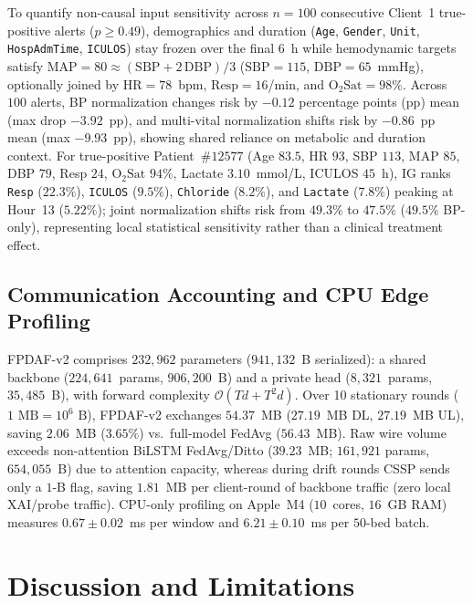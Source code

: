 \documentclass{llncs}
\begin{document}
To quantify non-causal input sensitivity across $n=100$ consecutive Client~1 true-positive alerts ($p\ge 0.49$), demographics and duration (\texttt{Age}, \texttt{Gender}, \texttt{Unit}, \texttt{HospAdmTime}, \texttt{ICULOS}) stay frozen over the final $6$~h while hemodynamic targets satisfy $\mathrm{MAP}=80\approx (\mathrm{SBP}+2\,\mathrm{DBP})/3$ ($\mathrm{SBP}=115$, $\mathrm{DBP}=65$~mmHg), optionally joined by $\mathrm{HR}=78$~bpm, $\mathrm{Resp}=16$/min, and $\mathrm{O}_2\mathrm{Sat}=98\%$. Across $100$ alerts, BP normalization changes risk by $-0.12$ percentage points (pp) mean (max drop $-3.92$~pp), and multi-vital normalization shifts risk by $-0.86$~pp mean (max $-9.93$~pp), showing shared reliance on metabolic and duration context. For true-positive Patient~$\#12577$ (Age $83.5$, HR $93$, SBP $113$, MAP $85$, DBP $79$, Resp $24$, $\mathrm{O}_2\mathrm{Sat}$ $94\%$, Lactate $3.10$~mmol/L, ICULOS $45$~h), IG ranks \texttt{Resp} ($22.3\%$), \texttt{ICULOS} ($9.5\%$), \texttt{Chloride} ($8.2\%$), and \texttt{Lactate} ($7.8\%$) peaking at Hour~13 ($5.22\%$); joint normalization shifts risk from $49.3\%$ to $47.5\%$ ($49.5\%$ BP-only), representing local statistical sensitivity rather than a clinical treatment effect.

\subsection{Communication Accounting and CPU Edge Profiling}

FPDAF-v2 comprises $232{,}962$ parameters ($941{,}132$~B serialized): a shared backbone ($224{,}641$~params, $906{,}200$~B) and a private head ($8{,}321$~params, $35{,}485$~B), with forward complexity $\mathcal{O}(Td+T^2d)$. Over 10 stationary rounds ($1\text{ MB}=10^6\text{ B}$), FPDAF-v2 exchanges $54.37$~MB ($27.19$~MB DL, $27.19$~MB UL), saving $2.06$~MB ($3.65\%$) vs.\ full-model FedAvg ($56.43$~MB). Raw wire volume exceeds non-attention BiLSTM FedAvg/Ditto ($39.23$~MB; $161{,}921$ params, $654{,}055$~B) due to attention capacity, whereas during drift rounds CSSP sends only a $1$-B flag, saving $1.81$~MB per client-round of backbone traffic (zero local XAI/probe traffic). CPU-only profiling on Apple~M4 ($10$~cores, $16$~GB RAM) measures $0.67\pm 0.02$~ms per window and $6.21\pm 0.10$~ms per $50$-bed batch.

\section{Discussion and Limitations}
\end{document}
